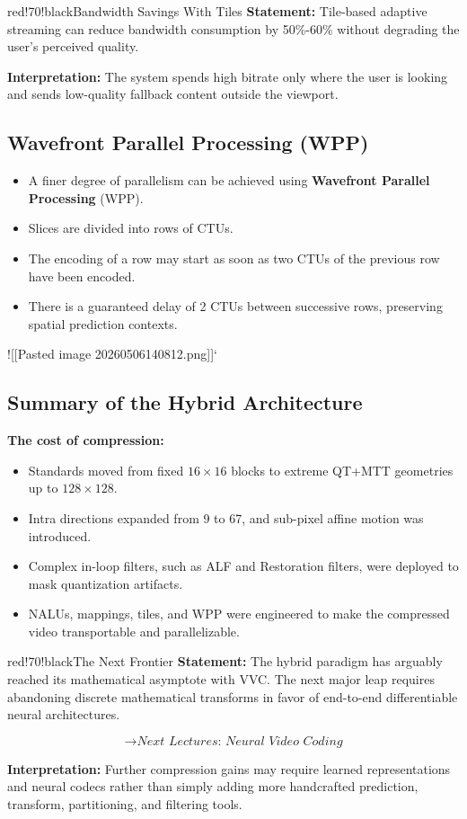 \begin{calloutbox}{red!70!black}{Bandwidth Savings With Tiles}
\textbf{Statement:} Tile-based adaptive streaming can reduce bandwidth consumption by 50\%-60\% without degrading the user's perceived quality.

\textbf{Interpretation:} The system spends high bitrate only where the user is looking and sends low-quality fallback content outside the viewport.
\end{calloutbox}

\subsection{Wavefront Parallel Processing (WPP)}

\begin{itemize}
\item A finer degree of parallelism can be achieved using \textbf{Wavefront Parallel Processing} (WPP).
\item Slices are divided into rows of CTUs.
\item The encoding of a row may start as soon as two CTUs of the previous row have been encoded.
\item There is a guaranteed delay of 2 CTUs between successive rows, preserving spatial prediction contexts.
\end{itemize}

![[Pasted image 20260506140812.png]]`

\subsection{Summary of the Hybrid Architecture}

\textbf{The cost of compression:}

\begin{itemize}
\item Standards moved from fixed $16 \times 16$ blocks to extreme QT+MTT geometries up to $128 \times 128$.
\item Intra directions expanded from 9 to 67, and sub-pixel affine motion was introduced.
\item Complex in-loop filters, such as ALF and Restoration filters, were deployed to mask quantization artifacts.
\item NALUs, mappings, tiles, and WPP were engineered to make the compressed video transportable and parallelizable.
\end{itemize}

\begin{calloutbox}{red!70!black}{The Next Frontier}
\textbf{Statement:} The hybrid paradigm has arguably reached its mathematical asymptote with VVC. The next major leap requires abandoning discrete mathematical transforms in favor of end-to-end differentiable neural architectures.

\[
\rightarrow \textit{Next Lectures: Neural Video Coding}
\]

\textbf{Interpretation:} Further compression gains may require learned representations and neural codecs rather than simply adding more handcrafted prediction, transform, partitioning, and filtering tools.
\end{calloutbox}

